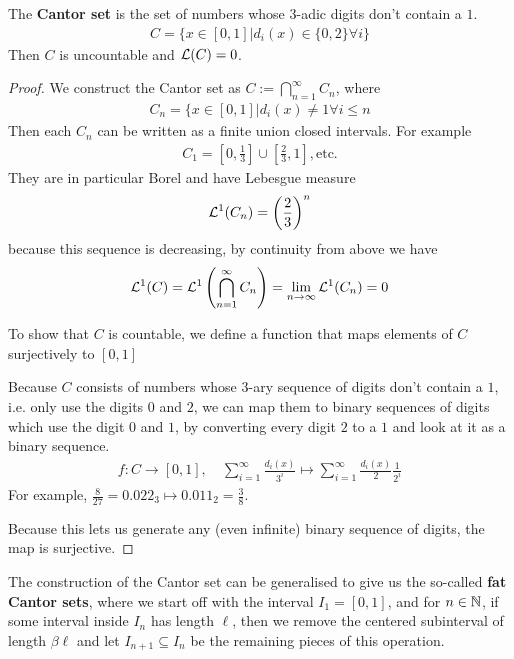 \begin{prop}[]
The \textbf{Cantor set} is the set of numbers whose $3$-adic digits don't contain a $1$.
\begin{align*}
  C = \{x \in [0,1] \big\vert d_i(x) \in \{0,2\} \forall i\}
\end{align*}
Then $C$ is uncountable and $\mathcal{L}(C) = 0$.
\end{prop}
\begin{proof}
  We construct the Cantor set as $C := \bigcap_{n = 1}^{\infty}C_n$, where
  \begin{align*}
    C_n = \{x \in [0,1] \big\vert d_i(x) \neq 1 \forall i \leq n
  \end{align*}
  Then each $C_n$ can be written as a finite union closed intervals. For example
  \begin{align*}
    C_1 = \left[0, \frac{1}{3}\right] \cup \left[\frac{2}{3},1\right], \text{etc.}
  \end{align*}
  They are in particular Borel and have Lebesgue measure
  \begin{align*}
    \mathcal{L}^{1}(C_n) = \left(
      \frac{2}{3}
    \right)^{n}
  \end{align*}
  because this sequence is decreasing, by continuity from above we have
  \begin{align*}
    \mathcal{L}^{1}(C) = \mathcal{L}^{1} \left(
      \bigcap_{n=1}^{\infty}C_n
    \right)
    =
    \lim_{n \to \infty} \mathcal{L}^{1}(C_n) = 0
  \end{align*}

  To show that $C$ is countable, we define a function that maps elements of $C$ surjectively to $[0,1]$


  Because $C$ consists of numbers whose $3$-ary sequence of digits don't contain a $1$, i.e. only use the digits $0$ and $2$, 
  we can map them to binary sequences of digits which use the digit $0$ and $1$, by converting every digit $2$ to a $1$ and look at it as a binary sequence.
  \begin{align*}
    f: C \to [0,1], \quad \sum_{i=1}^{\infty} \frac{d_i(x)}{3^{i}} \mapsto \sum_{i=1}^{\infty} \frac{d_i(x)}{2} \frac{1}{2^{i}}
  \end{align*}
  For example,
  $
    \frac{8}{27} = 0.022_3 \mapsto 0.011_2 = \frac{3}{8} .
  $
  
  Because this lets us generate any (even infinite) binary sequence of digits, the map is surjective. 
\end{proof}


The construction of the Cantor set can be generalised to give us the so-called \textbf{fat Cantor sets}, where we start off with the interval $I_1 = [0,1]$, and for $n \in \mathbb{N}$, if some interval inside $I_n$ has length $\ell$, then we remove the centered subinterval of length $\beta \ell$ and let $I_{n+1} \subseteq I_n$ be the remaining pieces of this operation.

